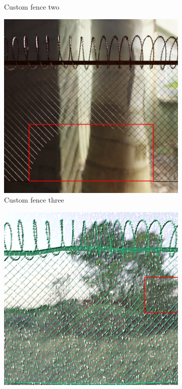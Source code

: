 \documentclass[../Head/Main.tex]{subfiles}
\begin{document}
\begin{figure}[H]
\begin{subfigure}{.3\textwidth}
        \caption{Custom fence two}
        \label{fig:custom_fence_two}
    \end{subfigure}
    \hfill
    \begin{subfigure}{.3\textwidth}
        \centering
        \includegraphics[width=\textwidth]{../Figures/augmentations/img_bb150.png}
        \caption{Custom fence three}
        \label{fig:custom_fence_three}
    \end{subfigure}
    \hfill
    \begin{subfigure}{.3\textwidth}
        \centering
        \includegraphics[width=\textwidth]{../Figures/augmentations/img_bb35.png}

\end{subfigure}
\end{figure}
\end{document}
